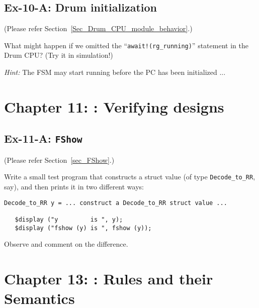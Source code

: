 
\subsection*{Ex-10-A: Drum initialization}
\label{Ex-10-A-Drum-initialization}

(Please refer Section~\ref{Sec_Drum_CPU_module_behavior}.)

What might happen if we omitted the ``{\tt await!(rg\_running)}''
statement in the Drum CPU? (Try it in simulation!)

\emph{Hint:} The FSM may start running before the PC has been initialized ...


\hdivider

\section*{Chapter 11: {\BSV}: Verifying {\BSV} designs}


\subsection*{Ex-11-A: {\tt FShow}}
\label{Ex-11-A-FShow}

(Please refer Section~\ref{sec_FShow}.)

Write a small test program that constructs a struct value (of type
{\tt Decode\_to\_RR}, say), and then prints it in two different ways:

{\footnotesize
\begin{Verbatim}[frame=single]
   Decode_to_RR y = ... construct a Decode_to_RR struct value ...

   $display ("y         is ", y);
   $display ("fshow (y) is ", fshow (y));
\end{Verbatim}
}

Observe and comment on the difference.


\hdivider

\section*{Chapter 13: {\BSV}: Rules and their Semantics}

